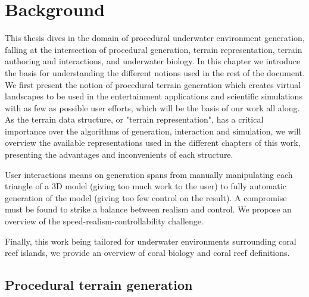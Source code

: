 \resetgraphicspath
{}

\chapter{Background}
\label{chap:background}
\minitoc

This thesis dives in the domain of procedural underwater environment generation, falling at the intersection of procedural generation, terrain representation, terrain authoring and interactions, and underwater biology. In this chapter we introduce the basis for understanding the different notions used in the rest of the document. We first present the notion of procedural terrain generation which creates virtual landscapes to be used in the entertainment applications and scientific simulations with as few as possible user efforts, which will be the basis of our work all along. As the terrain data structure, or "terrain representation", has a critical importance over the algorithms of generation, interaction and simulation, we will overview the available representations used in the different chapters of this work, presenting the advantages and inconvenients of each structure. 

User interactions means on generation spans from manually manipulating each triangle of a 3D model (giving too much work to the user) to fully automatic generation of the model (giving too few control on the result). A compromise must be found to strike a balance between realism and control. We propose an overview of the speed-realism-controllability challenge.

Finally, this work being tailored for underwater environments surrounding coral reef islands, we provide an overview of coral biology and coral reef definitions.

\section{Procedural terrain generation}
\label{sec:state-of-the-art_procedural-generation}

